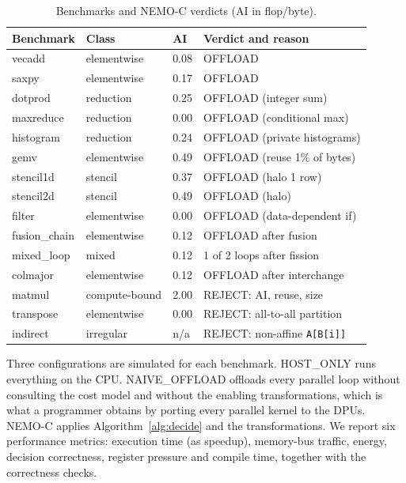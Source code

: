 \documentclass{ieeeaccess}
\begin{document}
\begin{table}[!t]
\caption{Benchmarks and NEMO-C verdicts (AI in flop/byte).}
\label{tab:bench}
\setlength{\tabcolsep}{2.5pt}
\renewcommand{\arraystretch}{1.08}
\centering
\begin{tabular}{|p{1.45cm}|p{1.9cm}|p{0.65cm}|p{3.5cm}|}
\hline
\textbf{Benchmark} & \textbf{Class} & \textbf{AI} & \textbf{Verdict and reason} \\ \hline
vecadd & elementwise & 0.08 & OFFLOAD \\ \hline
saxpy & elementwise & 0.17 & OFFLOAD \\ \hline
dotprod & reduction & 0.25 & OFFLOAD (integer sum) \\ \hline
maxreduce & reduction & 0.00 & OFFLOAD (conditional max) \\ \hline
histogram & reduction & 0.24 & OFFLOAD (private histograms) \\ \hline
gemv & elementwise & 0.49 & OFFLOAD (reuse 1\% of bytes) \\ \hline
stencil1d & stencil & 0.37 & OFFLOAD (halo 1 row) \\ \hline
stencil2d & stencil & 0.49 & OFFLOAD (halo) \\ \hline
filter & elementwise & 0.00 & OFFLOAD (data-dependent if) \\ \hline
fusion\_chain & elementwise & 0.12 & OFFLOAD after fusion \\ \hline
mixed\_loop & mixed & 0.12 & 1 of 2 loops after fission \\ \hline
colmajor & elementwise & 0.12 & OFFLOAD after interchange \\ \hline
matmul & compute-bound & 2.00 & REJECT: AI, reuse, size \\ \hline
transpose & elementwise & 0.00 & REJECT: all-to-all partition \\ \hline
indirect & irregular & n/a & REJECT: non-affine \texttt{A[B[i]]} \\ \hline
\end{tabular}
\end{table}

Three configurations are simulated for each benchmark. HOST\_ONLY runs everything on the CPU. NAIVE\_OFFLOAD offloads every parallel loop without consulting the cost model and without the enabling transformations, which is what a programmer obtains by porting every parallel kernel to the DPUs. NEMO-C applies Algorithm~\ref{alg:decide} and the transformations. We report six performance metrics: execution time (as speedup), memory-bus traffic, energy, decision correctness, register pressure and compile time, together with the correctness checks.
\end{document}
